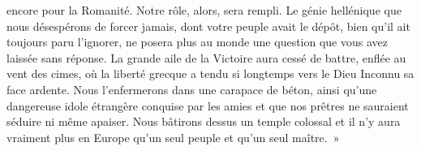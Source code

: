 \documentclass[french,twoside]{book} %
\newcommand{\astertri}{\medskip\par\centerline{\color{rubric}\large\selectfont{\syms ✻\,✻\,✻}}\medskip\par}%
\begin{document}
encore pour la Romanité. Notre rôle, alors, sera rempli. Le génie hellénique que nous désespérons de forcer jamais, dont votre peuple avait le dépôt, bien qu’il ait toujours paru l’ignorer, ne posera plus au monde une question que vous avez laissée sans réponse. La grande aile de la Victoire aura cessé de battre, enflée au vent des cimes, où la liberté grecque a tendu si longtemps vers le Dieu Inconnu sa face ardente. Nous l’enfermerons dans une carapace de béton, ainsi qu’une dangereuse idole étrangère conquise par les amies et que nos prêtres ne sauraient séduire ni même apaiser. Nous bâtirons dessus un temple colossal et il n’y aura vraiment plus en Europe qu’un seul peuple et qu’un seul maître. »\par
 \par

\astertri
\end{document}
